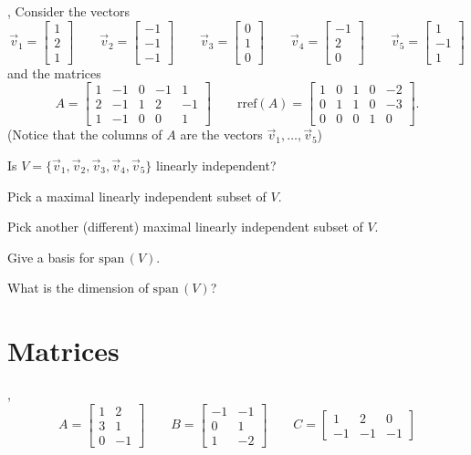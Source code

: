\documentclass[letter]{article}
\newcommand{\Span}{\mathrm{span}\,}
\newcommand{\rref}{\mathrm{rref}}
\newcommand{\mat}[1]{\begin{bmatrix}#1\end{bmatrix}}
\renewcommand{\emph}[1]{{\color{defcolor} \textbf{\textit{##1}}}}
\begin{document}
	\sep
	Consider the vectors
	\[
		\vec v_1=\mat{1\\2\\1}
		\qquad
		\vec v_2=\mat{-1\\-1\\-1}
		\qquad
		\vec v_3=\mat{0\\1\\0}
		\qquad
		\vec v_4=\mat{-1\\2\\0}
		\qquad
		\vec v_5=\mat{1\\-1\\1}
	\]
	and the matrices
	\[
		A=\mat{1&-1&0&-1&1\\ 2&-1&1&2&-1\\1 & -1&0&0&1}
		\qquad \rref (A)
		=\mat{1&0&1&0&-2\\0&1&1&0&-3\\0&0&0&1&0}.
	\]
	(Notice that the columns of $A$ are the vectors $\vec v_1,\ldots, \vec v_5$)

	\begin{Enum}
		\item Is $V=\{\vec v_1,\vec v_2,\vec v_3,\vec v_4,\vec v_5\}$ linearly
		independent?
		\item Pick a maximal linearly independent subset of $V$.
		\item Pick another (different) maximal linearly independent subset of $V$.
		\item Give a basis for $\Span(V)$.
		\item What is the dimension of $\Span(V)$?
	\end{Enum}

\newpage




\section*{Matrices}
	\sep
	\[
		A=\mat{1&2\\3&1\\0&-1}
		\qquad
		B=\mat{-1&-1\\0&1\\1&-2}
		\qquad
		C=\mat{1&2&0\\-1&-1&-1}
	\]
\end{document}

